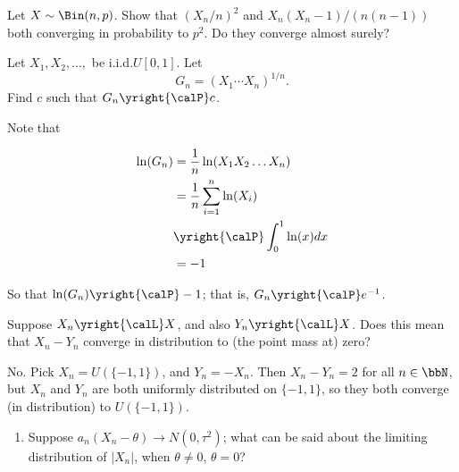 \begin{problem}[DasGupta 7.17]
  Let \(X\sim\Bin(n,p)\). Show that \((X_n/n)^2\) and
  \(X_n(X_n-1)/(n(n-1))\) both converging in probability to \(p^2\). Do
  they converge almost surely?
\end{problem}
\begin{solution}

\end{solution}
\newpage

\begin{problem}[DasGupta 7.21]
  Let \(X_1,X_2,\dotsc,\) be i.i.d.\@ \(U[0,1]\). Let
  \[
    G_n=(X_1\dotsm X_n)^{1/n}.
  \]
  Find \(c\) such that \(G_n\yright{\calP} c\).
\end{problem}
\begin{solution}

Note that

\begin{align*}
  \ln(G_n) &= \frac{1}{n} \ln(X_1 X_2 \ldots X_n) \\
           &= \frac{1}{n} \sum_{i=1}^n \ln(X_i) \\
           &\yright{\calP} \int_0^1 \ln(x) dx \\
           &= -1 \\
\end{align*}

So that $\ln(G_n) \yright{\calP} -1$; that is, $G_n \yright{\calP} e^{-1}$.

\end{solution}
\newpage

\begin{problem}
  Suppose \(X_n\yright{\calL}X\), and also \(Y_n\yright{\calL} X\). Does
  this mean that \(X_n-Y_n\) converge in distribution to (the point mass
  at) zero?
\end{problem}
\begin{solution}
  No. Pick $X_n = U(\{-1,1\})$, and $Y_n = -X_n$. Then $X_n-Y_n = 2$ for
  all $n \in \bbN$, but $X_n$ and $Y_n$ are both uniformly distributed on
  $\{-1,1\}$, so they both converge (in distribution) to $U(\{-1,1\})$.

\end{solution}
\newpage

\begin{problem}[DasGupta 7.31 (a)]
  \begin{enumerate}[label=(\alph*),noitemsep]
  \item Suppose \(a_n(X_n-\theta)\to N(0,\tau^2)\); what can be said
    about the limiting distribution of \(|X_n|\), when \(\theta\neq 0\),
    \(\theta=0\)?
  \end{enumerate}
\end{problem}
\begin{solution}

\end{solution}

